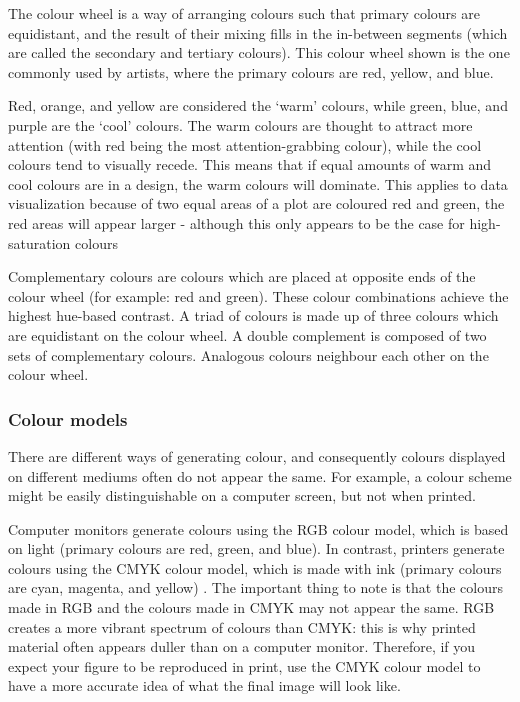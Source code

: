 \documentclass[letterpaper]{article}\usepackage[]{graphicx}\usepackage[]{color}
\begin{document}
The colour wheel is a way of arranging colours such that primary colours are equidistant, and the result of their mixing fills in the in-between segments (which are called the secondary and tertiary colours). This colour wheel shown is the one commonly used by artists, where the primary colours are red, yellow, and blue. 

Red, orange, and yellow are considered the `warm' colours, while green, blue, and purple are the `cool' colours. The warm colours are thought to attract more attention (with red being the most attention-grabbing colour), while the cool colours tend to visually recede. This means that if equal amounts of warm and cool colours are in a design, the warm colours will dominate. This applies to data visualization because of two equal areas of a plot are coloured red and green, the red areas will appear larger \cite{tedford} - although this only appears to be the case for high-saturation colours \cite{cleveland-colour-illusion}

Complementary colours are colours which are placed at opposite ends of the colour wheel (for example: red and green). These colour combinations achieve the highest hue-based contrast. A triad of colours is made up of three colours which are equidistant on the colour wheel. A double complement is composed of two sets of complementary colours. Analogous colours neighbour each other on the colour wheel. 

\subsubsection{Colour models}
There are different ways of generating colour, and consequently colours displayed on different mediums often do not appear the same. For example, a colour scheme might be easily distinguishable on a computer screen, but not when printed. 

Computer monitors generate colours using the RGB colour model, which is based on light (primary colours are red, green, and blue). In contrast, printers generate colours using the CMYK colour model, which is made with ink (primary colours are cyan, magenta, and yellow) \cite{silva}. The important thing to note is that the colours made in RGB and the colours made in CMYK may not appear the same. RGB creates a more vibrant spectrum of colours than CMYK: this is why printed material often appears duller than on a computer monitor. Therefore, if you expect your figure to be reproduced in print, use the CMYK colour model to have a more accurate idea of what the final image will look like.
\end{document}
